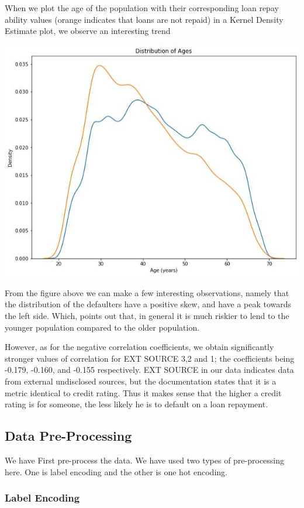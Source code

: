 \documentclass[sigconf, nonacm]{acmart}
\begin{document}
When we plot the age of the population with their corresponding loan repay ability values (orange indicates that loans are not repaid) in a Kernel Density Estimate plot, we observe an interesting trend

\includegraphics[width=\linewidth]{figures/FIG3.jpg}

From the figure above we can make a few interesting observations, namely that the distribution of the defaulters have a positive skew, and have a peak towards the left side. Which, points out that, in general it is much riskier to lend to the younger population compared to the older population.

However, as for the negative correlation coefficients, we obtain significantly stronger values of correlation for EXT SOURCE 3,2 and 1; the coefficients being -0.179, -0.160, and -0.155 respectively. EXT SOURCE in our data indicates data from external undisclosed sources, but the documentation states that it is a metric identical to credit rating. Thus it makes sense that the higher a credit rating is for someone, the less likely he is to default on a loan repayment.

\subsection{Data Pre-Processing}

We have First pre-process the data. We have used two types of pre-processing here. One is label encoding and the other is one hot encoding.

\subsubsection{Label Encoding}
\end{document}
